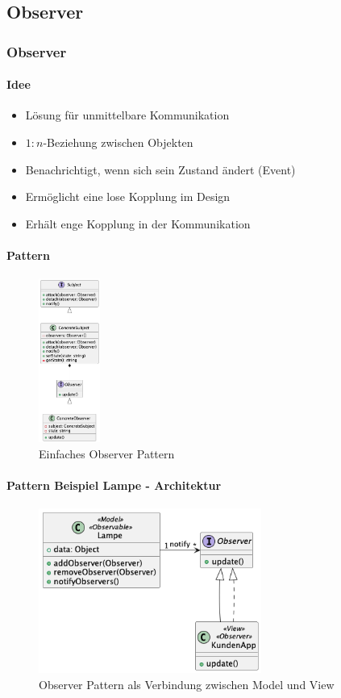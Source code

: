 \subsection{Observer}
\begin{frame}
  \frametitle{Observer}
  \framesubtitle{Idee}
  \begin{itemize}
    \item Lösung für unmittelbare Kommunikation
    \item $1:n$-Beziehung zwischen Objekten 
    \item Benachrichtigt, wenn sich sein Zustand ändert (Event)
    \item Ermöglicht eine lose Kopplung im Design
    \item Erhält enge Kopplung in der Kommunikation
  \end{itemize}
\end{frame}

\begin{frame}
  \framesubtitle{Pattern}
  \begin{figure}[ht]
    \centering
    \includegraphics[width=0.18\textwidth]{fig/uml/default-observer.png}
    \caption{Einfaches Observer Pattern}
    \label{fig:default-observer}
  \end{figure}
\end{frame}

\begin{frame}
  \framesubtitle{Pattern Beispiel Lampe - Architektur}
  \begin{figure}[ht]
    \centering
    \includegraphics[width=0.65\textwidth]{fig/uml/mvc-observer.png}
    \caption{Observer Pattern als Verbindung zwischen Model und View}
    \label{fig:mvc-observer}
  \end{figure}
\end{frame}

